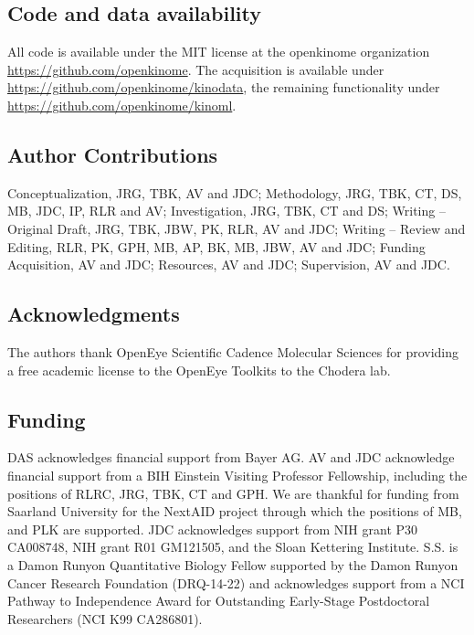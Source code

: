 \documentclass[9pt,lessons]{livecoms}
\begin{document}
\subsection{Code and data availability}
All code is available under the MIT license at the openkinome organization \url{https://github.com/openkinome}. The acquisition is available under \url{https://github.com/openkinome/kinodata}, the remaining functionality under \url{https://github.com/openkinome/kinoml}.

\subsection{Author Contributions}
Conceptualization, JRG, TBK, AV and JDC; 
Methodology, JRG, TBK, CT, DS, MB, JDC, IP, RLR and AV; 
Investigation, JRG, TBK, CT and DS; 
Writing – Original Draft, JRG, TBK, JBW, PK, RLR, AV and JDC; 
Writing – Review and Editing, RLR, PK, GPH, MB, AP, BK, MB, JBW, AV and JDC; 
Funding Acquisition, AV and JDC; 
Resources, AV and JDC;
Supervision, AV and JDC.

\subsection{Acknowledgments}

The authors thank OpenEye Scientific Cadence Molecular Sciences for providing a free academic license to the OpenEye Toolkits to the Chodera lab.


\subsection{Funding}

DAS acknowledges financial support from Bayer AG. AV and JDC acknowledge financial support from a BIH Einstein Visiting Professor Fellowship, including the positions of RLRC, JRG, TBK, CT and GPH. We are thankful for funding from Saarland University for the NextAID project through which the positions of MB, and PLK are supported. JDC acknowledges support from NIH grant P30 CA008748, NIH grant R01 GM121505, and the Sloan Kettering Institute.  S.S. is a Damon Runyon Quantitative Biology Fellow supported by the Damon Runyon Cancer Research Foundation (DRQ-14-22) and acknowledges support from a NCI Pathway to Independence Award for Outstanding Early-Stage Postdoctoral Researchers (NCI K99 CA286801).
\end{document}
